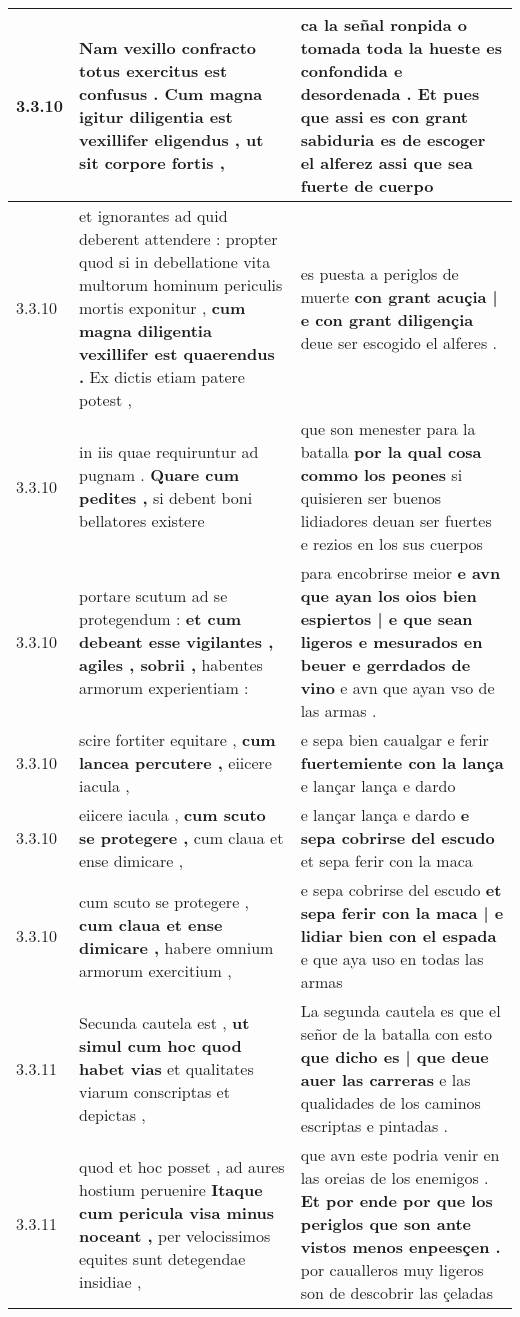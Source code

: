 \begin{tabular}{|p{1cm}|p{6.5cm}|p{6.5cm}|}
3.3.10 & Nam vexillo confracto totus exercitus est confusus . \textbf{ Cum magna igitur diligentia est vexillifer eligendus , } ut sit corpore fortis , & ca la señal ronpida o tomada toda la hueste es confondida e desordenada . \textbf{ Et pues que assi es con grant sabiduria es de escoger el alferez } assi que sea fuerte de cuerpo \\\hline
3.3.10 & et ignorantes ad quid deberent attendere : propter quod si in debellatione vita multorum hominum periculis mortis exponitur , \textbf{ cum magna diligentia vexillifer est quaerendus . } Ex dictis etiam patere potest , & es puesta a periglos de muerte \textbf{ con grant acuçia | e con grant diligençia } deue ser escogido el alferes . \\\hline
3.3.10 & in iis quae requiruntur ad pugnam . \textbf{ Quare cum pedites , } si debent boni bellatores existere & que son menester para la batalla \textbf{ por la qual cosa commo los peones } si quisieren ser buenos lidiadores deuan ser fuertes e rezios en los sus cuerpos \\\hline
3.3.10 & portare scutum ad se protegendum : \textbf{ et cum debeant esse vigilantes , agiles , sobrii , } habentes armorum experientiam : & para encobrirse meior \textbf{ e avn que ayan los oios bien espiertos | e que sean ligeros e mesurados en beuer e gerrdados de vino } e avn que ayan vso de las armas . \\\hline
3.3.10 & scire fortiter equitare , \textbf{ cum lancea percutere , } eiicere iacula , & e sepa bien caualgar e ferir \textbf{ fuertemiente con la lança } e lançar lança e dardo \\\hline
3.3.10 & eiicere iacula , \textbf{ cum scuto se protegere , } cum claua et ense dimicare , & e lançar lança e dardo \textbf{ e sepa cobrirse del escudo } et sepa ferir con la maca \\\hline
3.3.10 & cum scuto se protegere , \textbf{ cum claua et ense dimicare , } habere omnium armorum exercitium , & e sepa cobrirse del escudo \textbf{ et sepa ferir con la maca | e lidiar bien con el espada } e que aya uso en todas las armas \\\hline
3.3.11 & Secunda cautela est , \textbf{ ut simul cum hoc quod habet vias } et qualitates viarum conscriptas et depictas , & La segunda cautela es que el señor de la batalla con esto \textbf{ que dicho es | que deue auer las carreras } e las qualidades de los caminos escriptas e pintadas . \\\hline
3.3.11 & quod et hoc posset , ad aures hostium peruenire \textbf{ Itaque cum pericula visa minus noceant , } per velocissimos equites sunt detegendae insidiae , & que avn este podria venir en las oreias de los enemigos . \textbf{ Et por ende por que los periglos que son ante vistos menos enpeesçen . } por caualleros muy ligeros son de descobrir las çeladas \\\hline

\end{tabular}
